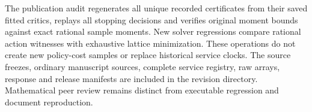 \documentclass[ecta,nameyear,draft]{econsocart}
\begin{document}
The publication audit regenerates all unique recorded certificates from their saved fitted critics, replays all stopping decisions and verifies original moment bounds against exact rational sample moments. New solver regressions compare rational action witnesses with exhaustive lattice minimization. These operations do not create new policy-cost samples or replace historical service clocks. The source freezes, ordinary manuscript sources, complete service registry, raw arrays, response and release manifests are included in the revision directory. Mathematical peer review remains distinct from executable regression and document reproduction.



\end{document}
